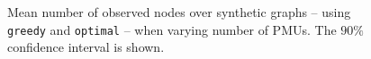 \begin{figure}[t]
\begin{center}
  \end{center}
	\caption{Mean number of observed nodes over synthetic graphs -- using {\tt greedy} and {\tt optimal} -- when varying number of PMUs. The $90\%$ confidence interval is shown.}
  \label{fig:maxinc-res}
\end{figure}

\begin{figure}[t]
  \begin{center}

\end{center}
\end{figure}

